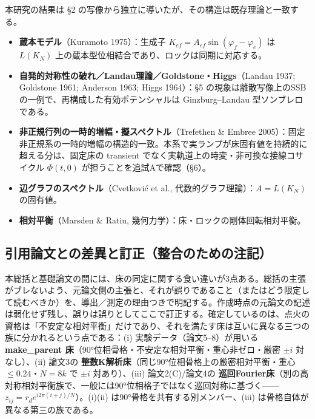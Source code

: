 \documentclass[
  a4paper,
]{ltjsarticle}
\providecommand{\tightlist}{%
  \setlength{\itemsep}{0pt}\setlength{\parskip}{0pt}}
\begin{document}
本研究の結果は §2
の写像から独立に導いたが、その構造は既存理論と一致する。

\begin{itemize}
\tightlist
\item
  \textbf{蔵本モデル}（Kuramoto 1975）：生成子
  \(K_{ef}=A_{ef}\sin(\varphi_f-\varphi_e)\) は \(L(K_N)\)
  上の蔵本型位相結合であり、ロックは同期に対応する。
\item
  \textbf{自発的対称性の破れ／Landau理論／Goldstone・Higgs}（Landau
  1937; Goldstone 1961; Anderson 1963; Higgs 1964）：§5
  の現象は離散写像上のSSBの一例で、再構成した有効ポテンシャルは
  Ginzburg--Landau 型ソンブレロである。
\item
  \textbf{非正規行列の一時的増幅・擬スペクトル}（Trefethen \& Embree
  2005）：固定非正規系の一時的増幅の構造的一致。本系で実ランプが床固有値を持続的に超える分は、固定床の
  transient でなく実軌道上の時変・非可換な接線コサイクル \(\Phi(t,0)\)
  が担うことを追試Aで確認（§6）。
\item
  \textbf{辺グラフのスペクトル}（Cvetković et al.,
  代数的グラフ理論）：\(A=L(K_N)\) の固有値。
\item
  \textbf{相対平衡}（Marsden \& Ratiu,
  幾何力学）：床・ロックの剛体回転相対平衡。
\end{itemize}

\subsection{引用論文との差異と訂正（整合のための注記）}\label{ux5f15ux7528ux8ad6ux6587ux3068ux306eux5deeux7570ux3068ux8a02ux6b63ux6574ux5408ux306eux305fux3081ux306eux6ce8ux8a18}

本総括と基礎論文の間には、床の同定に関する食い違いが3点ある。総括の主張がブレないよう、元論文側の主張と、それが誤りであること（またはどう限定して読むべきか）を、導出／測定の理由つきで明記する。作成時点の元論文の記述は弱化せず残し、誤りは誤りとしてここで訂正する。確定しているのは、点火の資格は「不安定な相対平衡」だけであり、それを満たす床は互いに異なる三つの族に分かれるという点である：(i)
実験データ（論文5--8）が用いる \textbf{make\_parent
床}（90°位相骨格・不安定な相対平衡・重心非ゼロ・厳密 \(\pm i\)
対なし）、(ii) 論文3の
\textbf{整数K解析床}（同じ90°位相骨格上の厳密相対平衡・重心
\(\le0.24\)・\(N=8k\) で \(\pm i\) 対あり）、(iii) 論文2(C)/論文4の
\textbf{巡回Fourier床}（別の高対称相対平衡族で、一般には90°位相格子ではなく巡回対称に基づく------\(z_{ij}=r_d e^{i2\pi(i+j)/N}\)）。(i)(ii)
は90°骨格を共有する別メンバー、(iii) は骨格自体が異なる第三の族である。
\end{document}
